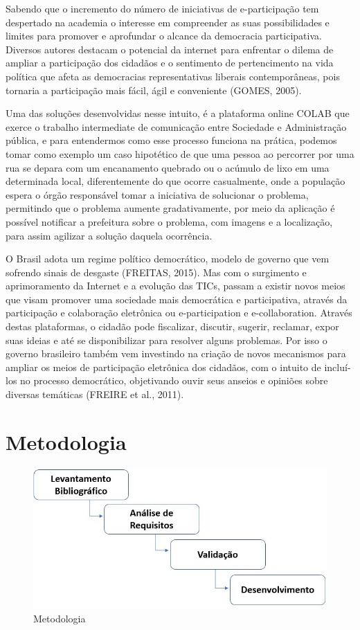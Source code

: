\documentclass[12pt]{article}
\begin{document}
Sabendo que o incremento do número de iniciativas de e-participação tem despertado na academia o interesse em compreender as suas possibilidades e limites para promover e aprofundar o alcance da democracia participativa. Diversos autores destacam o potencial da internet para enfrentar o dilema de ampliar a participação dos cidadãos e o sentimento de pertencimento na vida política que afeta as democracias representativas liberais contemporâneas, pois tornaria a participação mais fácil, ágil e conveniente (GOMES, 2005).

Uma das soluções desenvolvidas nesse intuito, é a plataforma online COLAB que exerce o trabalho intermediate de comunicação entre Sociedade e Administração pública, e para entendermos como esse processo funciona na prática, podemos tomar como exemplo um caso hipotético de que uma pessoa ao percorrer por uma rua se depara com um encanamento quebrado ou o acúmulo de lixo em uma determinada local, diferentemente do que ocorre casualmente, onde a população espera o órgão responsável tomar a iniciativa de solucionar o problema, permitindo que o problema aumente gradativamente, por meio da aplicação é possível notificar a prefeitura sobre o problema, com imagens e a localização, para assim agilizar a solução daquela ocorrência.

O Brasil adota um regime político democrático, modelo de governo que vem sofrendo sinais de desgaste (FREITAS, 2015). Mas com o surgimento e aprimoramento da Internet e a evolução das TICs, passam a existir novos meios que visam promover uma sociedade mais democrática e participativa, através da participação e colaboração eletrônica ou e-participation e e-collaboration. Através destas plataformas, o cidadão pode fiscalizar, discutir, sugerir, reclamar, expor suas ideias e até se disponibilizar para resolver alguns problemas. Por isso o governo brasileiro também vem investindo na criação de novos mecanismos para ampliar os meios de participação eletrônica dos cidadãos, com o intuito de incluí-los no processo democrático, objetivando ouvir seus anseios e opiniões sobre diversas temáticas (FREIRE et al., 2011).

\section{Metodologia}\label{sec:figs}
\begin{figure}[H]
\centering
\includegraphics[width=15cm]{fig01.jpg}
\caption{Metodologia}
\end{figure}
\end{document}
